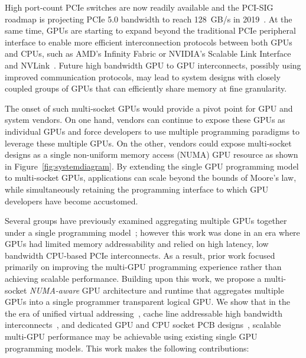 High port-count PCIe switches are now readily available
and the PCI-SIG roadmap is projecting PCIe 5.0 bandwidth 
to reach \SI{128}{GB/s} in 2019~\cite{PCIeSwitches}. At the same time, GPUs are starting to expand 
beyond the traditional PCIe peripheral interface to enable more efficient interconnection
protocols between both GPUs and CPUs, such as AMD's Infinity Fabric or NVIDIA's Scalable Link Interface
and NVLink~\cite{dgx,SierraHPC,AMDINFINITYFABRIC,NVLINK,NVIDIASLI}.
Future high bandwidth GPU to GPU interconnects, possibly using
improved communication protocols, may lead to system designs with closely coupled
groups of GPUs that can efficiently share memory at fine granularity.

The onset of such multi-socket GPUs would provide a pivot point for GPU and system 
vendors. On one hand, vendors can continue to expose these GPUs as 
individual GPUs and force developers to use multiple
programming paradigms to 
leverage these multiple GPUs. On the other, vendors could expose multi-socket 
designs as a single non-uniform memory access (NUMA) GPU resource as shown in Figure~\ref{fig:systemdiagram}.  
By extending the single GPU programming model to multi-socket GPUs,  applications 
can scale beyond the bounds of Moore's law, while simultaneously retaining the 
programming interface to which GPU developers have become accustomed.

Several groups have previously examined aggregating multiple GPUs together under 
a single programming model~\cite{lee2013transparent,Cabezas2015}; however this 
work was done in an era where GPUs had limited memory addressability and relied 
on high latency, low bandwidth CPU-based PCIe interconnects. As a result, prior work 
focused primarily on improving the multi-GPU programming experience rather than 
achieving scalable performance. Building upon this work, we propose a 
multi-socket \textit{NUMA-aware} GPU architecture and runtime that aggregates 
multiple GPUs into a single programmer transparent logical GPU. We show that in 
the the era of unified virtual addressing~\cite{UVM}, cache line addressable 
high bandwidth interconnects~\cite{NVLINK}, and dedicated GPU and CPU socket PCB 
designs~\cite{SierraHPC}, scalable multi-GPU performance may be achievable using 
existing single GPU programming models. This work makes the following 
contributions:

